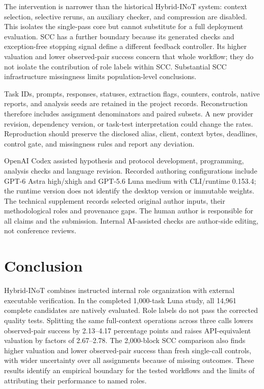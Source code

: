 The intervention is narrower than the historical Hybrid-INoT system: context selection, selective reruns, an auxiliary checker, and compression are disabled. This isolates the single-pass core but cannot substitute for a full deployment evaluation. SCC has a further boundary because its generated checks and exception-free stopping signal define a different feedback controller. Its higher valuation and lower observed-pair success concern that whole workflow; they do not isolate the contribution of role labels within SCC. Substantial SCC infrastructure missingness limits population-level conclusions.

Task IDs, prompts, responses, statuses, extraction flags, counters, controls, native reports, and analysis seeds are retained in the project records. Reconstruction therefore includes assignment denominators and paired subsets. A new provider revision, dependency version, or task-test interpretation could change the rates. Reproduction should preserve the disclosed alias, client, context bytes, deadlines, control gate, and missingness rules and report any deviation.

OpenAI Codex assisted hypothesis and protocol development, programming, analysis checks and language revision. Recorded authoring configurations include GPT-6 Astra high/xhigh and GPT-5.6 Luna medium with CLI/runtime 0.153.4; the runtime version does not identify the desktop version or immutable weights. The technical supplement records selected original author inputs, their methodological roles and provenance gaps. The human author is responsible for all claims and the submission. Internal AI-assisted checks are author-side editing, not conference reviews.

\section{Conclusion}
Hybrid-INoT combines instructed internal role organization with external executable verification. In the completed 1,000-task Luna study, all 14,961 complete candidates are natively evaluated. Role labels do not pass the corrected quality tests. Splitting the same full-context operations across three calls lowers observed-pair success by 2.13--4.17 percentage points and raises API-equivalent valuation by factors of 2.67--2.78. The 2,000-block SCC comparison also finds higher valuation and lower observed-pair success than fresh single-call controls, with wider uncertainty over all assignments because of missing outcomes. These results identify an empirical boundary for the tested workflows and the limits of attributing their performance to named roles.
